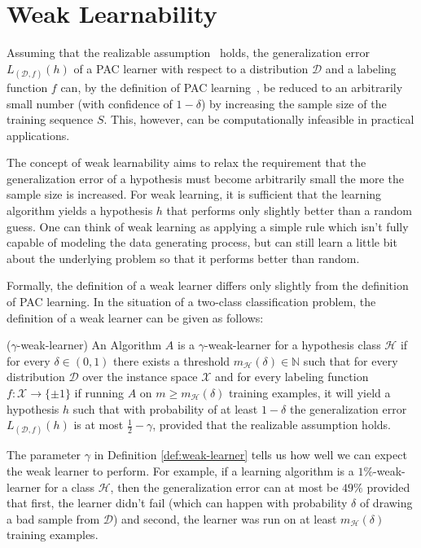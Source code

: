 \section{Weak Learnability}

Assuming that the realizable assumption~\cite[chapter 2]{SSBD14} holds, the generalization error
$L_{(\mathcal{D}, f)}(h)$ of a PAC learner with respect to a distribution $\mathcal{D}$ and a
labeling function $f$ can, by the definition of PAC learning~\mbox{\cite[chapter 2]{SSBD14}},
be reduced to an arbitrarily
small number (with confidence of $1-\delta$) by increasing the sample size of the training sequence $S$.
This, however, can be computationally infeasible in practical applications.

The concept of weak learnability aims to relax the requirement that the generalization error of a hypothesis must
become arbitrarily small the more the sample size is increased.
For weak learning, it is sufficient that the learning algorithm yields a hypothesis $h$ that performs only slightly
better than a random guess.
One can think of weak learning as applying a simple rule which isn't fully capable of modeling the data generating process,
but can still learn a little bit about the underlying problem so that it performs better than random.

Formally, the definition of a weak learner differs only slightly from the definition of PAC learning.
In the situation of a two-class classification problem, the definition of a weak learner can be given as follows:

\begin{definition}{($\gamma$-weak-learner)}
\label{def:weak-learner}
An Algorithm $A$ is a $\gamma$-weak-learner for a hypothesis class $\mathcal{H}$ if for every $\delta \in (0, 1)$ there
exists a threshold $m_\mathcal{H}(\delta) \in \mathbb{N}$
such that for every distribution $\mathcal{D}$ over the instance space $\mathcal{X}$
and for every labeling function $f: \mathcal{X} \rightarrow \{\pm 1\}$
if running $A$ on $m \geq m_\mathcal{H}(\delta)$ training
examples, it will yield a hypothesis $h$ such that with probability of at least $1-\delta$ the generalization error
$L_{(\mathcal{D}, f)}(h)$ is at most $\frac{1}{2} - \gamma$, provided that the realizable assumption holds.
\end{definition}

The parameter $\gamma$ in Definition \ref{def:weak-learner} tells us how well we can expect the weak learner to perform.
For example, if a learning algorithm is a $1\%$-weak-learner for a class $\mathcal{H}$, then the generalization
error can at most be $49\%$ provided that first, the learner didn't fail
(which can happen with probability $\delta$ of drawing a bad sample from $\mathcal{D}$)
and second, the learner was run on at least $m_\mathcal{H}(\delta)$ training examples.

